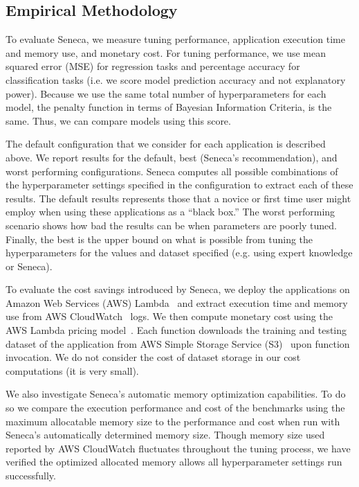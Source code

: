 \subsection{Empirical Methodology}

To evaluate Seneca, we measure tuning performance, application execution time and memory use,
and monetary cost.  For tuning performance, we use mean squared error (MSE)
for regression tasks and percentage accuracy for classification tasks (i.e. we score
model prediction accuracy and not explanatory power).  Because we use the same 
total number of hyperparameters for each model, the penalty function in terms of 
Bayesian Information Criteria, is the same. Thus, we can compare models using
this score.

The default configuration that we consider for each application is described
above.  We report results for the default, best (Seneca's recommendation), and
worst performing configurations.  Seneca computes all possible combinations of
the hyperparameter settings specified in the configuration to extract each of
these results.  The default results represents those that a novice or first
time user might employ when using these applications as a ``black box.''  The
worst performing scenario shows how bad the results can be when parameters are
poorly tuned.  Finally, the best is the upper bound on what is possible from
tuning the hyperparameters for the values and dataset specified 
(e.g. using expert knowledge or Seneca). 

To evaluate the cost savings introduced by Seneca, we deploy the applications
on Amazon Web Services (AWS) Lambda~\cite{ref:awslambda} and extract
execution time and memory use from AWS CloudWatch~\cite{ref:awscloudwatch} logs.  
We then compute monetary cost
using the AWS Lambda pricing model~\cite{ref:pricing}.
Each function downloads the training and testing dataset 
of the application from AWS Simple Storage Service (S3)~\cite{ref:awss3} upon function invocation. 
We do not consider the cost of dataset storage in our cost computations (it is very small).

We also investigate Seneca's automatic memory optimization capabilities.  To
do so we compare the execution performance and cost of the benchmarks using
the maximum allocatable memory size to the performance and cost when run with
Seneca's automatically determined memory size. Though memory size used reported by AWS CloudWatch fluctuates throughout the tuning process, we have verified the optimized allocated memory allows all hyperparameter settings run successfully.

